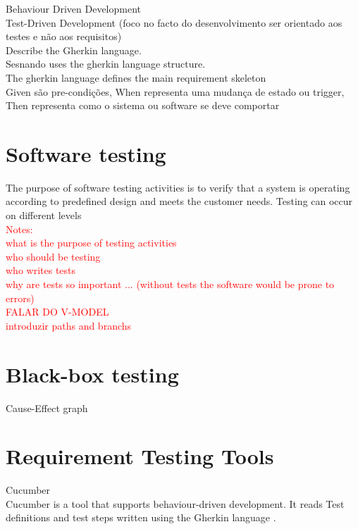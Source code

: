 Behaviour Driven Development\\
Test-Driven Development (foco no facto do desenvolvimento ser orientado aos testes e não aos requisitos)\\
Describe the Gherkin language.\\
Sesnando uses the gherkin language structure.\\
The gherkin language defines the main requirement skeleton\\
Given são pre-condições, When representa uma mudança de estado ou trigger, Then representa como o sistema ou software se deve comportar\\


\section{Software testing}
\label{sec:software_testing}

The purpose of software testing activities is to verify that a system is operating according to predefined design and meets the customer needs.
Testing can occur on different levels 
\\
\textcolor{red}{
Notes:\\
what is the purpose of testing activities\\
who should be testing\\
who writes tests\\
why are tests so important ... (without tests the software would be prone to errors)\\
FALAR DO V-MODEL\\
introduzir paths and branchs
}


\label{sec:black-box testing}
\section{Black-box testing}

Cause-Effect graph 

\label{sec:requirement_testing}
\section{Requirement Testing Tools}

Cucumber\\
Cucumber is a tool that supports behaviour-driven development. It reads Test definitions and test steps written using the Gherkin language \cite{cucumber}.\\

